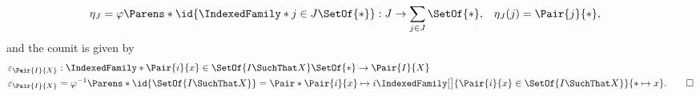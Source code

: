 \begin{solution}
\begin{align*}
\eta_J &= \varphi\Parens*{\id{\IndexedFamily*{j \in J}{\SetOf{*}}}}: J \to \sum_{j \in J} \SetOf{*}, &
\eta_J(j) &= \Pair{j}{*},
\end{align*}
and the counit is given by
\begin{align*}
\varepsilon_{\Pair{I}{X}}
&: \IndexedFamily*{\Pair{i}{x} \in \SetOf{I \SuchThat X}}{\SetOf{*}} \to \Pair{I}{X} \\
\varepsilon_{\Pair{I}{X}}
&= \varphi^{-1}\Parens*{\id{\SetOf{I \SuchThat X}}}
= \Pair*{\Pair{i}{x} \mapsto i}{\IndexedFamily[\big]{\Pair{i}{x} \in \SetOf{I \SuchThat X}}{* \mapsto x}}.
\qedhere
\end{align*}
\end{solution}